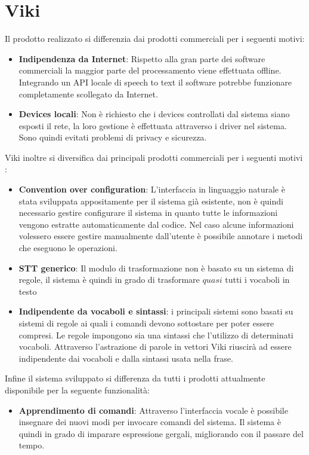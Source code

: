 \documentclass[twoside]{supsistudent}
\begin{document}
\section{Viki}
Il prodotto realizzato si differenzia dai prodotti commerciali per i seguenti motivi:
\begin{itemize}
	\item \textbf{Indipendenza da Internet}: Rispetto alla gran parte dei software commerciali la maggior parte del processamento viene effettuata offline. Integrando un API locale di speech to text il software potrebbe funzionare completamente scollegato da Internet.
	\item \textbf{Devices locali}: Non è richiesto che i devices controllati dal sistema siano esposti il rete, la loro gestione è effettuata attraverso i driver nel sistema. Sono quindi evitati problemi di privacy e sicurezza.
\end{itemize}
Viki inoltre si diversifica dai principali prodotti commerciali per i seguenti motivi :
\begin{itemize}
	\item \textbf{Convention over configuration}: L'interfaccia in linguaggio naturale è stata sviluppata appositamente per il sistema già esistente, non è quindi necessario gestire configurare il sistema in quanto tutte le informazioni vengono estratte automaticamente dal codice. Nel caso alcune informazioni volessero essere gestire manualmente dall'utente è possibile annotare i metodi che eseguono le operazioni.
	\item \textbf{STT generico}: Il modulo di trasformazione non è basato su un sistema di regole, il sistema è quindi in grado di trasformare \(quasi\) tutti i vocaboli in testo
	\item \textbf{Indipendente da vocaboli e sintassi}: i principali sistemi sono basati su sistemi di regole ai quali i comandi devono sottostare per poter essere compresi. Le regole impongono sia una sintassi che l'utilizzo di determinati vocaboli. Attraverso l'astrazione di parole in vettori Viki riuscirà ad essere indipendente dai vocaboli e dalla sintassi usata nella frase.
\end{itemize}
Infine il sistema sviluppato si differenza da tutti i prodotti attualmente disponibile per la seguente funzionalità:
\begin{itemize}
	\item \textbf{Apprendimento di comandi}: Attraverso l'interfaccia vocale è possibile insegnare dei nuovi modi per invocare comandi del sistema. Il sistema è quindi in grado di imparare espressione gergali, migliorando con il passare del tempo.
\end{itemize}
\end{document}
